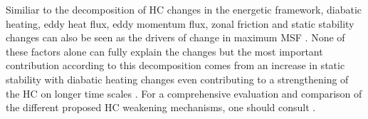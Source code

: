 Similiar to the decomposition of HC changes in the energetic framework, diabatic heating, eddy heat flux, eddy momentum flux, zonal friction and static stability changes can also be seen as the drivers of change in maximum MSF \parencite{vallisResponseLargescaleStructure2015}. None of these factors alone can fully explain the changes but the most important contribution according to this decomposition comes from an increase in static stability with diabatic heating changes even contributing to a strengthening of the HC on longer time scales \parencite{chemkeElucidatingMechanismsResponsible2021}.
For a comprehensive evaluation and comparison of the different proposed HC weakening mechanisms, one should consult
\textcite{chemkeElucidatingMechanismsResponsible2021}.







